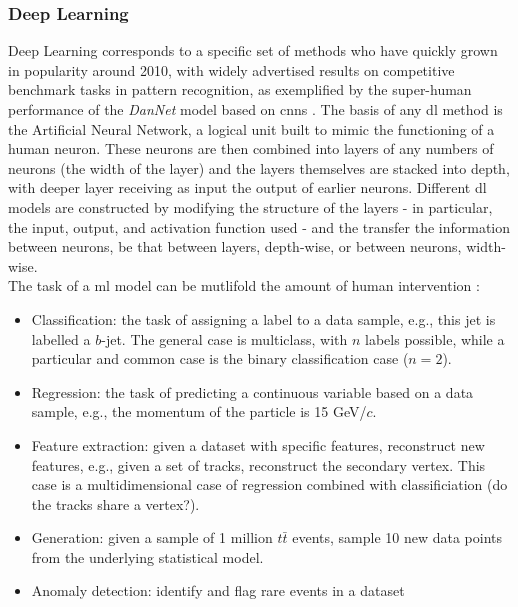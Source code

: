 \subsubsection{Deep Learning} 
Deep Learning corresponds to a specific set of methods who have quickly grown in popularity around 2010, with widely advertised results on competitive benchmark tasks in pattern recognition, as exemplified by the super-human performance of the \textit{DanNet} \cite{DanNet} model based on \gls{cnn}s \cite{NIPS1989_53c3bce6}. The basis of any \gls{dl} method is the Artificial Neural Network, a logical unit built to mimic the functioning of a human neuron. These neurons are then combined into layers of any numbers of neurons (the width of the layer) and the layers themselves are stacked into depth, with deeper layer receiving as input the output of earlier neurons. Different \gls{dl} models are constructed by modifying the structure of the layers - in particular, the input, output, and activation function used - and the transfer the information between neurons, be that between layers, depth-wise, or  between neurons, width-wise.\\
The task of a \gls{ml} model can be mutlifold the amount of human intervention \cite{Murphy_ML}: 
\begin{itemize}
    \item Classification: the task of assigning a label to a data sample, e.g., this jet is labelled a $b$-jet. The general case is multiclass, with $n$ labels possible, while a particular and common case is the binary classification case ($n = 2$).
    \item Regression: the task of predicting a continuous variable based on a data sample, e.g., the momentum of the particle is 15 GeV/$c$. 
    \item Feature extraction: given a dataset with specific features, reconstruct new features, e.g., given a set of tracks, reconstruct the secondary vertex. This case is a multidimensional case of regression combined with classificiation (do the tracks share a vertex?).
    \item Generation: given a sample of 1 million $t\bar{t}$ events, sample 10 new data points from the underlying statistical model. 
    \item Anomaly detection: identify and flag rare events in a dataset
\end{itemize}

